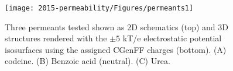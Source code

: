 \begin{figure}[htbp]
\begin{center}
	\texttt{[image: 2015-permeability/Figures/permeants1]}
	\caption{Three permeants tested shown as 2D schematics (top) and 3D structures rendered with the $\pm 5$ kT/e electrostatic potential isosurfaces
using the assigned CGenFF charges (bottom).  (A) codeine.  (B) Benzoic acid (neutral).  (C) Urea.}
	\label{fig:permeants}
\end{center}
\end{figure}

